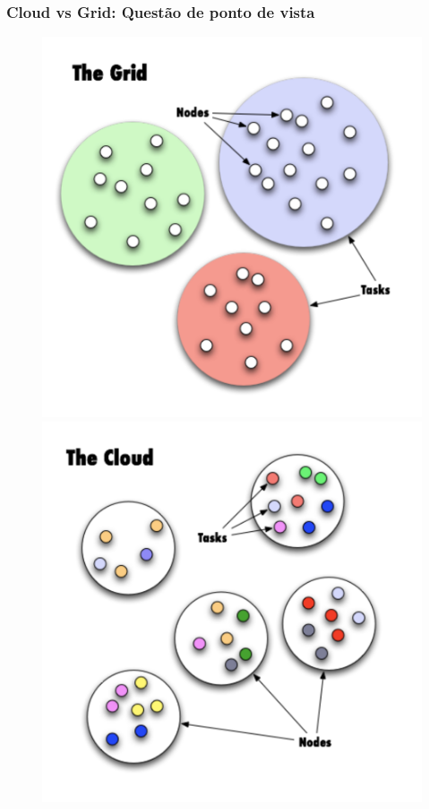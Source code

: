 \documentclass[10pt]{beamer}
\begin{document}
	\begin{frame}%
	\frametitle{Cloud vs Grid: Questão de ponto de vista}
		\begin{figure}
		\centering
			\includegraphics[scale=0.29]{./figuras/grid-nodes.pdf}
			\includegraphics[scale=0.29]{./figuras/cloud-nodes.pdf}
		\end{figure}
	\end{frame}
\end{document}
